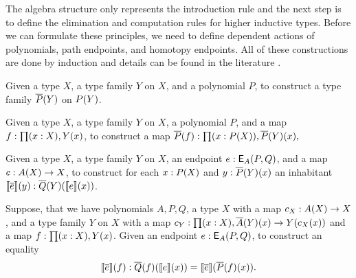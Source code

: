 The algebra structure only represents the introduction rule
and the next step is to define the elimination and computation rules for higher inductive types.
Before we can formulate these principles, we need to define dependent actions of polynomials, path endpoints, and homotopy endpoints.
All of these constructions are done by induction and details can be found in the literature \cite{DBLP:journals/entcs/DybjerM18,hermida1998structural,van2019construction}.

\begin{problem}
\label{prob:poly_dact}
Given a type $X$, a type family $Y$ on $X$, and a polynomial $P$,
to construct a type family $\overline{P}(Y)$ on $P(Y)$.
\end{problem}

\begin{problem}
\label{prob:poly_dmap}
Given a type $X$, a type family $Y$ on $X$, a polynomial $P$, and a map $f : \prod (x : X) , Y(x)$,
to construct a map
$
\overline{P}(f) : \prod (x : P(X)) , \overline{P}(Y)(x),
$
\end{problem}

\begin{problem}
\label{prob:endpoint_dact}
Given a type $X$, a type family $Y$ on $X$, an endpoint $e : \mathsf{E}_{A}(P,Q)$, and a map $c : A(X) \rightarrow X$,
to construct for each $x : P(X)$ and $y : \overline{P}(Y)(x)$ an inhabitant $\llbracket \overline{e} \rrbracket(y) : \overline{Q}(Y)(\llbracket e \rrbracket(x))$.
\end{problem}

\begin{problem}
\label{prob:endpoint_dact_natural}
Suppose, that we have polynomials $A, P, Q$, a type $X$ with a map $c_X : A(X) \rightarrow X$,
and a type family $Y$ on $X$ with a map $c_Y : \prod (x : X) , \overline{A}(Y)(x) \rightarrow Y(c_X(x))$
and a map $f : \prod (x : X) , Y(x)$.
Given an endpoint $e : \mathsf{E}_{A}(P,Q)$,
to construct an equality
\[
\llbracket \overline{e} \rrbracket(f) : \overline{Q}(f)(\llbracket e \rrbracket(x)) = \llbracket \overline{e} \rrbracket(\overline{P}(f)(x)).
\]
\end{problem}

